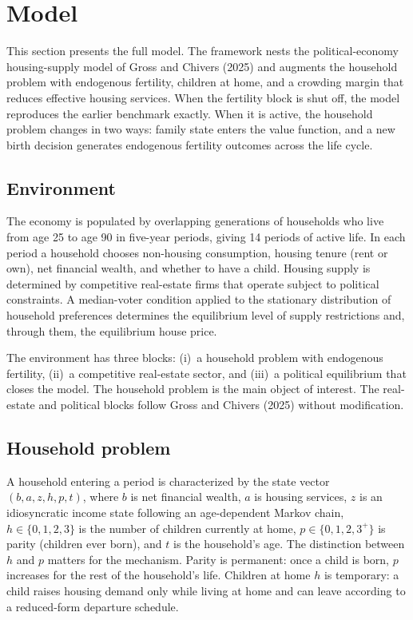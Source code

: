 \section{Model}\label{sec:model}

This section presents the full model. The framework nests the political-economy housing-supply model of Gross and Chivers (2025) and augments the household problem with endogenous fertility, children at home, and a crowding margin that reduces effective housing services. When the fertility block is shut off, the model reproduces the earlier benchmark exactly. When it is active, the household problem changes in two ways: family state enters the value function, and a new birth decision generates endogenous fertility outcomes across the life cycle.

\subsection{Environment}

The economy is populated by overlapping generations of households who live from age 25 to age 90 in five-year periods, giving 14 periods of active life. In each period a household chooses non-housing consumption, housing tenure (rent or own), net financial wealth, and whether to have a child. Housing supply is determined by competitive real-estate firms that operate subject to political constraints. A median-voter condition applied to the stationary distribution of household preferences determines the equilibrium level of supply restrictions and, through them, the equilibrium house price.

The environment has three blocks: (i)~a household problem with endogenous fertility, (ii)~a competitive real-estate sector, and (iii)~a political equilibrium that closes the model. The household problem is the main object of interest. The real-estate and political blocks follow Gross and Chivers (2025) without modification.

\subsection{Household problem}

A household entering a period is characterized by the state vector $(b, a, z, h, p, t)$, where $b$ is net financial wealth, $a$ is housing services, $z$ is an idiosyncratic income state following an age-dependent Markov chain, $h \in \{0, 1, 2, 3\}$ is the number of children currently at home, $p \in \{0, 1, 2, 3^{+}\}$ is parity (children ever born), and $t$ is the household's age. The distinction between $h$ and $p$ matters for the mechanism. Parity is permanent: once a child is born, $p$ increases for the rest of the household's life. Children at home $h$ is temporary: a child raises housing demand only while living at home and can leave according to a reduced-form departure schedule.

